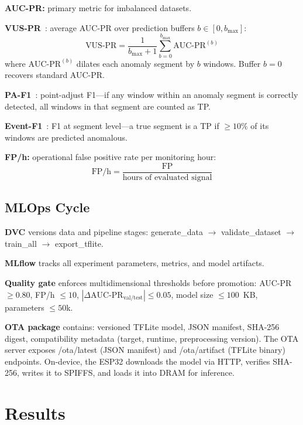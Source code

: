 \documentclass[conference]{IEEEtran}
\def\texttt#1{#1}%
\begin{document}
\textbf{AUC-PR:} primary metric for imbalanced datasets.

\textbf{VUS-PR}~\cite{kim2022towards}:
average AUC-PR over prediction buffers $b \in [0, b_{\max}]$:
\begin{equation}
  \text{VUS-PR} = \frac{1}{b_{\max}+1} \sum_{b=0}^{b_{\max}}
  \text{AUC-PR}^{(b)}
  \label{eq:vuspr}
\end{equation}
where $\text{AUC-PR}^{(b)}$ dilates each anomaly segment by $b$ windows.
Buffer $b=0$ recovers standard AUC-PR.

\textbf{PA-F1}~\cite{xu2018donut}:
point-adjust F1---if any window within an anomaly segment is correctly
detected, all windows in that segment are counted as TP.

\textbf{Event-F1}~\cite{tatbul2018precision}:
F1 at segment level---a true segment is a TP if $\geq10\%$ of its
windows are predicted anomalous.

\textbf{FP/h:} operational false positive rate per monitoring hour:
\begin{equation}
  \text{FP/h} = \frac{\text{FP}}{\text{hours of evaluated signal}}
  \label{eq:fph}
\end{equation}

\subsection{MLOps Cycle}

\textbf{DVC} versions data and pipeline stages: \texttt{generate\_data $\to$
validate\_dataset $\to$ train\_all $\to$ export\_tflite}.

\textbf{MLflow} tracks all experiment parameters, metrics, and model artifacts.

\textbf{Quality gate} enforces multidimensional thresholds before promotion:
AUC-PR $\geq 0.80$, FP/h $\leq 10$, $|\Delta\text{AUC-PR}_\text{val/test}| \leq 0.05$,
model size $\leq 100$~KB, parameters $\leq 50$k.

\textbf{OTA package} contains: versioned TFLite model, JSON manifest,
SHA-256 digest, compatibility metadata (target, runtime, preprocessing version).
The OTA server exposes \texttt{/ota/latest} (JSON manifest) and
\texttt{/ota/artifact} (TFLite binary) endpoints.
On-device, the ESP32 downloads the model via HTTP, verifies SHA-256,
writes it to SPIFFS, and loads it into DRAM for inference.

\section{Results}
\label{sec:results}
\end{document}
